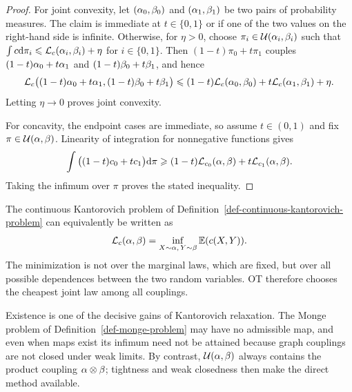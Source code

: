 \begin{proof}
	For joint convexity, let $(\alpha_0,\beta_0)$ and $(\alpha_1,\beta_1)$ be two pairs of probability measures. The claim is immediate at $t\in\{0,1\}$ or if one of the two values on the right-hand side is infinite. Otherwise, for $\eta>0$, choose $\pi_i\in\mathcal{U}(\alpha_i,\beta_i)$ such that $\int c\mathrm{d}\pi_i\leqslant\mathcal{L}_c(\alpha_i,\beta_i)+\eta$ for $i\in\{0,1\}$.
	Then $(1-t)\pi_0+t\pi_1$ couples $(1-t)\alpha_0+t\alpha_1$ and $(1-t)\beta_0+t\beta_1$, and hence
	\[
		\mathcal{L}_c\big((1-t)\alpha_0+t\alpha_1,(1-t)\beta_0+t\beta_1\big)
		\leqslant
		(1-t)\mathcal{L}_c(\alpha_0,\beta_0)+t\mathcal{L}_c(\alpha_1,\beta_1)+\eta.
	\]
	Letting $\eta\to0$ proves joint convexity.

	For concavity, the endpoint cases are immediate, so assume $t\in(0,1)$ and fix $\pi\in\mathcal{U}(\alpha,\beta)$. Linearity of integration for nonnegative functions gives
	\[
		\int\big((1-t)c_0+tc_1\big)\mathrm{d}\pi
		\geqslant
		(1-t)\mathcal{L}_{c_0}(\alpha,\beta)+t\mathcal{L}_{c_1}(\alpha,\beta).
	\]
	Taking the infimum over $\pi$ proves the stated inequality.
\end{proof}

\begin{rem}
	The continuous Kantorovich problem of Definition~\ref{def-continuous-kantorovich-problem} can equivalently be written as
	\[
		\mathcal{L}_c(\alpha,\beta)
		=
		\inf_{X\sim\alpha,\,Y\sim\beta}\mathbb{E}(c(X,Y)).
	\]
	The minimization is not over the marginal laws, which are fixed, but over all possible dependences between the two random variables. OT therefore chooses the cheapest joint law among all couplings.
\end{rem}

Existence is one of the decisive gains of Kantorovich relaxation. The Monge problem of Definition~\ref{def-monge-problem} may have no admissible map, and even when maps exist its infimum need not be attained because graph couplings are not closed under weak limits. By contrast, $\mathcal{U}(\alpha,\beta)$ always contains the product coupling $\alpha\otimes\beta$; tightness and weak closedness then make the direct method available.

